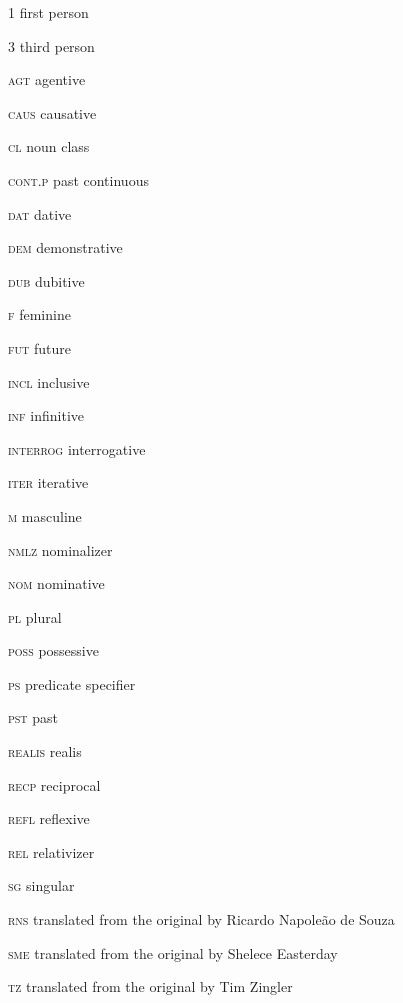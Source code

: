 \addchap{\lsAbbreviationsTitle} 

1    first person



3    third person



\textsc{agt}    agentive



\textsc{caus}    causative



\textsc{cl}    noun class



\textsc{cont.p}    past continuous



\textsc{dat}    dative



\textsc{dem}    demonstrative



\textsc{dub}    dubitive



\textsc{f}    feminine



\textsc{fut}    future



\textsc{incl}    inclusive



\textsc{inf}    infinitive



\textsc{interrog}  interrogative



\textsc{iter}    iterative



\textsc{m}    masculine



\textsc{nmlz}     nominalizer



\textsc{nom}    nominative



\textsc{pl}    plural



\textsc{poss}    possessive



\textsc{ps}    predicate specifier



\textsc{pst}    past



\textsc{realis}    realis



\textsc{recp}    reciprocal



\textsc{refl}    reflexive



\textsc{rel}    relativizer



\textsc{sg}    singular



\textsc{rns}    translated from the original by Ricardo Napoleão de Souza



\textsc{sme}    translated from the original by Shelece Easterday



\textsc{tz}    translated from the original by Tim Zingler
